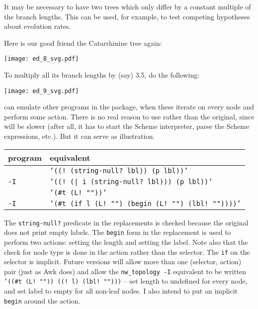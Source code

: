 
\begin{samepage}

\end{samepage}

\begin{samepage}

It may be necessary to have two trees which only differ by a constant multiple
of the branch lengths. This can be used, for example, to test competing
hypotheses about evolution rates.
\end{samepage}
Here is our good friend the Catarrhinine tree again:


\begin{center}
\texttt{[image: ed\_8\_svg.pdf]}
\end{center}

To multiply all its branch lengths by (say) 3.5, do the following:


\begin{center}
\texttt{[image: ed\_9\_svg.pdf]}
\end{center}

\begin{samepage}

\noindent{}\sched{} can emulate other programs in the package, when these
iterate on every node and perform some action. There is no real reason to use
\sched{} rather than the original, since \sched{} will be slower (after all, it
has to start the Scheme interpreter, parse the Scheme expressions, etc.). But it
can serve as illustration.
\end{samepage}

\begin{center}
\begin{tabular}{ll}
program & \sched{} equivalent \\
\hline
{}{} 						& {\tt '((! (string-null? lbl)) (p lbl))'}  \\
{} {\tt -I} 		& {\tt '((! (| i (string-null? lbl))) (p lbl))'} \\
\topology{}						& {\tt '(\#t (L! ""))'} \\
\topology{} {\tt -I} 	& {\tt '(\#t (if l (L! "") (begin (L! "") (lbl!  ""))))'}
\end{tabular}
\end{center}

The {\tt string-null?} predicate in the  replacements is checked
because the original  does not print empty labels. The {\tt begin} form
in the \topology{} replacement is used to perform two actions: setting the
length and setting the label. Note also that the check for node type is done in
the action rather than the selector. The {\tt if} on the selector is implicit.
Future versions will allow more than one (selector, action) pair (just as Awk
does) and allow the {\tt nw\_topology -I} equivalent to be written {\tt '((\#t
(L! "")) ((! l) (lbl! "")))} -- set length to undefined for every node, and set
label to empty for all non-leaf nodes. I also intend to put an implicit {\tt
begin} around the action.

